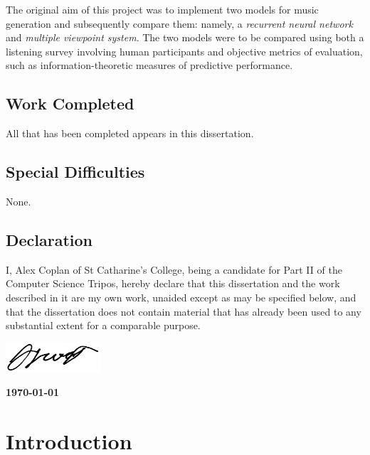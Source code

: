 \documentclass[12pt,a4paper,twoside,openright]{report}
\begin{document}
The original aim of this project was to implement two models for music
generation and subsequently compare them: namely, a \emph{recurrent neural
network} and \emph{multiple viewpoint system}. The two models were
to be compared using both a listening survey involving human participants and
objective metrics of evaluation, such as information-theoretic measures
of predictive performance.

\section*{Work Completed}

All that has been completed appears in this dissertation.

\section*{Special Difficulties}

None.
 
\newpage
\section*{Declaration}

I, Alex Coplan of St Catharine's College, being a candidate for Part II of the
Computer Science Tripos, hereby declare that this dissertation and the work
described in it are my own work, unaided except as may be specified below, and
that the dissertation does not contain material that has already been used to
any substantial extent for a comparable purpose.

\bigskip
{}
\includegraphics[width=100pt]{figs/signature.jpeg}

\medskip
{} 
\textbf{\today}

\tableofcontents

\listoffigures


\pagestyle{headings}

\chapter{Introduction}
\end{document}
